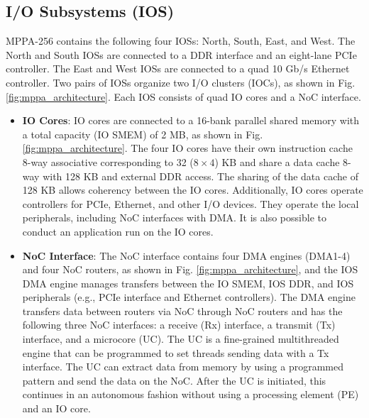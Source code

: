 \subsection{I/O Subsystems (IOS)}
\label{sec:ios}
MPPA-256 contains the following four IOSs: North, South, East, and West.
The North and South IOSs are connected to a DDR interface and an eight-lane PCIe controller.
The East and West IOSs are connected to a quad 10 Gb/s Ethernet controller.
Two pairs of IOSs organize two I/O clusters (IOCs), as shown in Fig. \ref{fig:mppa_architecture}.
Each IOS consists of quad IO cores and a NoC interface.

\begin{itemize}
  \setlength{\leftskip}{-5mm}    
  \item \textbf{IO Cores}: IO cores are connected to a 16-bank parallel shared memory with a total capacity (IO SMEM) of 2 MB, as shown in Fig. \ref{fig:mppa_architecture}.
  The four IO cores have their own instruction cache 8-way associative corresponding to 32 ($8 \times 4$) KB and share a data cache 8-way with 128 KB and external DDR access.
  The sharing of the data cache of 128 KB allows coherency between the IO cores.
  Additionally, IO cores operate controllers for PCIe, Ethernet, and other I/O devices.
  They operate the local peripherals, including NoC interfaces with DMA.
  It is also possible to conduct an application run on the IO cores.
  
  \item \textbf{NoC Interface}: The NoC interface contains four DMA engines (DMA1-4) and four NoC routers, as shown in Fig. \ref{fig:mppa_architecture}, and the IOS DMA engine manages transfers between the IO SMEM, IOS DDR, and IOS peripherals (e.g., PCIe interface and Ethernet controllers).
  The DMA engine transfers data between routers via NoC through NoC routers and has the following three NoC interfaces: a receive (Rx) interface, a transmit (Tx) interface, and a microcore (UC).
  The UC is a fine-grained multithreaded engine that can be programmed to set threads sending data with a Tx interface.
  The UC can extract data from memory by using a programmed pattern and send the data on the NoC.
  After the UC is initiated, this continues in an autonomous fashion without using a processing element (PE) and an IO core.
\end{itemize}
